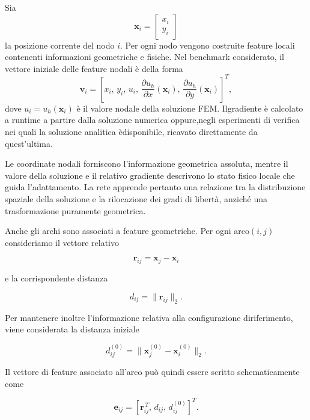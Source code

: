 Sia
\[
\mathbf{x}_i=
\begin{bmatrix}
x_i\\
y_i
\end{bmatrix}
\]
la posizione corrente del nodo $i$. Per ogni nodo vengono costruite feature locali contenenti informazioni geometriche e fisiche. Nel benchmark considerato, il vettore iniziale delle feature nodali è della forma
\begin{equation}
\mathbf{v}_i
=
\left[
x_i,\,
y_i,\,
u_i,\,
\frac{\partial u_h}{\partial x}(\mathbf{x}_i),\,
\frac{\partial u_h}{\partial y}(\mathbf{x}_i)
\right]^T,
\label{eq:node_features}
\end{equation}
dove $u_i=u_h(\mathbf{x}_i)$ è il valore nodale della soluzione FEM. Ilgradiente è calcolato a runtime a partire dalla soluzione numerica oppure,negli esperimenti di verifica nei quali la soluzione analitica èdisponibile, ricavato direttamente da quest'ultima.

Le coordinate nodali forniscono l'informazione geometrica assoluta, mentre il valore della soluzione e il relativo gradiente descrivono lo stato fisico locale che guida l'adattamento. La rete apprende pertanto una relazione tra la distribuzione spaziale della soluzione e la rilocazione dei gradi di libertà, anziché una trasformazione puramente geometrica.

Anche gli archi sono associati a feature geometriche. Per ogni arco$(i,j)$ consideriamo il vettore relativo

\begin{equation}
\mathbf{r}_{ij}
=
\mathbf{x}_j-\mathbf{x}_i
\label{eq:relative_edge_vector}
\end{equation}

e la corrispondente distanza

\begin{equation}
d_{ij}
=
\|\mathbf{r}_{ij}\|_2.
\label{eq:current_edge_length}
\end{equation}

Per mantenere inoltre l'informazione relativa alla configurazione diriferimento, viene considerata la distanza iniziale

\begin{equation}
d_{ij}^{(0)}
=
\|\mathbf{x}_j^{(0)}-\mathbf{x}_i^{(0)}\|_2.
\label{eq:initial_edge_length}
\end{equation}

Il vettore di feature associato all'arco può quindi essere scritto schematicamente come

\begin{equation}
\mathbf{e}_{ij}
=
\left[
\mathbf{r}_{ij}^{\,T},\,
d_{ij},\,
d_{ij}^{(0)}
\right]^T.
\label{eq:edge_features}
\end{equation}

